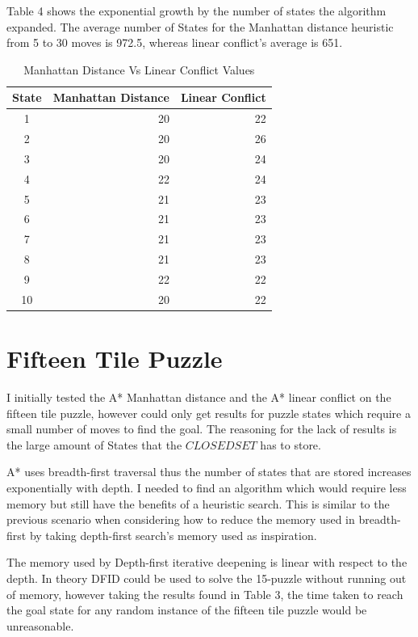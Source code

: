 \documentclass[progress]{cmpreport}
\begin{document}
  Table 4 shows the exponential growth by the number of states the algorithm expanded. The average number of States for the Manhattan distance heuristic from 5 to 30 moves is 972.5, whereas linear conflict's average is 651.


\begin{table}[ht]
	\caption{Manhattan Distance Vs Linear Conflict Values}
	\begin{center}
		\begin{tabular}{crr} \hline
			State & Manhattan Distance  & Linear Conflict    \\ \hline
			1  & 20 & 22  \\
			2 & 20  & 26 \\ 
			3 & 20 & 24  \\ 
			4 & 22 & 24  \\
		    5 & 21  & 23 \\ 
			6 & 21 & 23  \\ 
			7 & 21 & 23  \\ 
			8 & 21 & 23  \\ 
			9 & 22 & 22  \\ 
			10 & 20 & 22  \\ \hline
		\end{tabular}
	\end{center}
\end{table}


\section{Fifteen Tile Puzzle}
I initially tested the A* Manhattan distance and the A* linear conflict on the fifteen tile puzzle, however could only get results for puzzle states which require a small number of moves to find the goal. The reasoning for the lack of results is the large amount of States that the $CLOSEDSET$ has to store. 

A* uses breadth-first traversal thus the number of states that are stored increases exponentially with depth. I needed to find an algorithm which would require less memory but still have the benefits of a heuristic search. This is similar to the previous scenario when considering how to reduce the memory used in breadth-first by taking depth-first search's memory used as inspiration.

The memory used by Depth-first iterative deepening is linear with respect to the depth. In theory DFID could be used to solve the 15-puzzle without running out of memory, however taking the results found in Table 3, the time taken to reach the goal state for any random instance of the fifteen tile puzzle would be unreasonable.
\end{document}
